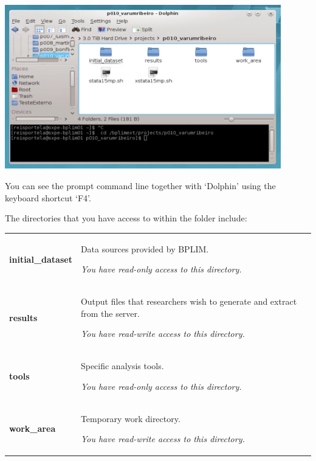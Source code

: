\documentclass[]{book}
\begin{document}
\includegraphics[width=4.72441in,height=2.80866in]{./media/image6.png}

You can see the prompt command line together with `Dolphin' using the
keyboard shortcut `F4'.

The directories that you have access to within the folder include:

\begin{longtable}[]{@{}ll@{}}
\toprule
\endhead
\begin{minipage}[t]{0.47\columnwidth}\raggedright
\textbf{initial\_dataset}\strut
\end{minipage} & \begin{minipage}[t]{0.47\columnwidth}\raggedright
Data sources provided by BPLIM.

\emph{You have
read-only access to this
directory.}\strut
\end{minipage}\tabularnewline
\begin{minipage}[t]{0.47\columnwidth}\raggedright
\textbf{results}\strut
\end{minipage} & \begin{minipage}[t]{0.47\columnwidth}\raggedright
Output files that
researchers wish to generate
and extract from the server.

\emph{You
have read-write access to this
directory.}\strut
\end{minipage}\tabularnewline
\begin{minipage}[t]{0.47\columnwidth}\raggedright
\textbf{tools}\strut
\end{minipage} & \begin{minipage}[t]{0.47\columnwidth}\raggedright
Specific analysis tools.

\emph{You have read-only access to
this directory.}\strut
\end{minipage}\tabularnewline
\begin{minipage}[t]{0.47\columnwidth}\raggedright
\textbf{work\_area}\strut
\end{minipage} & \begin{minipage}[t]{0.47\columnwidth}\raggedright
Temporary
work directory.

\emph{You have read-write
access to this directory.}\strut
\end{minipage}\tabularnewline
\bottomrule
\end{longtable}
\end{document}
